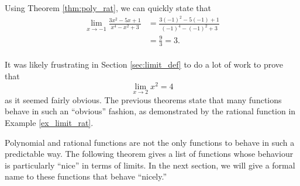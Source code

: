 \enlargethispage{1\baselineskip}

{Using Theorem \ref{thm:poly_rat}, we can quickly state that 
	\begin{align*} \lim_{x\to -1}\frac{3x^2-5x+1}{x^4-x^2+3} &= \frac{3(-1)^2-5(-1)+1}{(-1)^4-(-1)^2+3} \\
												&= \frac{9}{3} =3.
	\end{align*}
\baselineskip
}\\

It was likely frustrating in Section \ref{sec:limit_def} to do a lot of work to prove that $$\lim_{x\to 2} x^2 = 4$$ as it seemed fairly obvious. The previous theorems state that many functions behave in such an ``obvious'' fashion, as demonstrated by the rational function in Example \ref{ex_limit_rat}. 

Polynomial and rational functions are not the only functions to behave in such a predictable way. The following theorem gives a list of functions whose behaviour is particularly ``nice'' in terms of limits. In the next section, we will give a formal name to these functions that behave ``nicely.''


